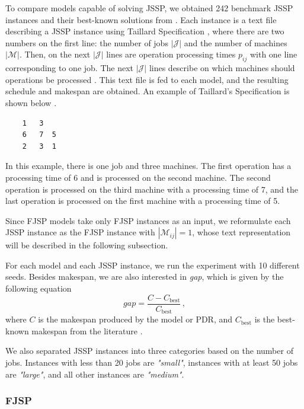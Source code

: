 To compare models capable of solving JSSP, we obtained 242 benchmark JSSP instances and their best-known solutions from \cite{jssp_benchmarks}. Each instance is a text file describing a JSSP instance using Taillard Specification \cite{taillard_specification}, where there are two numbers on the first line: the number of jobs $|\mathcal{J}|$ and the number of machines $|\mathcal{M}|$. Then, on the next $|\mathcal{J}|$ lines are operation processing times $p_{ij}$ with one line corresponding to one job. The next $|\mathcal{J}|$ lines describe on which machines should operations be processed \cite{jssp_benchmarks}. This text file is fed to each model, and the resulting schedule and makespan are obtained.  An example of Taillard's Specification is shown below \cite{jssp_benchmarks}.
\begin{verbatim}
    1   3
    6   7  5
    2   3  1    
\end{verbatim}
In this example, there is one job and three machines. The first operation has a processing time of 6 and is processed on the second machine. The second operation is processed on the third machine with a processing time of 7, and the last operation is processed on the first machine with a processing time of 5.
\par
Since FJSP models take only FJSP instances as an input, we reformulate each JSSP instance as the FJSP instance with $|\mathcal{M}_{ij}| = 1$, whose text representation will be described in the following subsection. 
\par
For each model and each JSSP instance, we run the experiment with 10 different seeds. Besides makespan, we are also interested in \textit{gap}, which is given by the following equation
\begin{equation}
    gap  = \frac{C - C_\text{best}}{C_\text{best}} \, ,
\end{equation}
where $C$ is the makespan produced by the model or PDR, and $C_\text{best}$ is the best-known makespan from the literature \cite{jssp_benchmarks}.
\par
We also separated JSSP instances into three categories based on the number of jobs. Instances with less than 20 jobs are \textit{"small"}, instances with at least 50 jobs are \textit{"large"}, and all other instances are \textit{"medium"}.

\subsubsection{FJSP}

